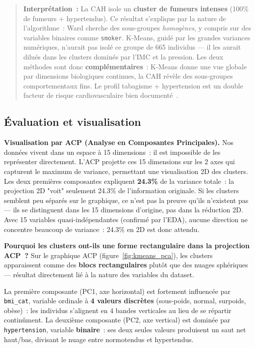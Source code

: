 \begin{quote}
\textbf{Interprétation~:} La CAH isole un \textbf{cluster de fumeurs intenses} (100\% de fumeurs + hypertendus). Ce résultat s'explique par la nature de l'algorithme~: Ward cherche des sous-groupes \textit{homogènes}, y compris sur des variables binaires comme \texttt{smoker}. K-Means, guidé par les grandes variances numériques, n'aurait pas isolé ce groupe de 665 individus --- il les aurait dilués dans les clusters dominés par l'IMC et la pression. Les deux méthodes sont donc \textbf{complémentaires}~: K-Means donne une vue globale par dimensions biologiques continues, la CAH révèle des sous-groupes comportementaux fins. Le profil tabagisme + hypertension est un double facteur de risque cardiovasculaire bien documenté~\cite{booth2012}.
\end{quote}

\FloatBarrier

\subsection{Évaluation et visualisation}

\textbf{Visualisation par ACP (Analyse en Composantes Principales).} Nos données vivent dans un espace à 15 dimensions~: il est impossible de les représenter directement. L'ACP projette ces 15 dimensions sur les 2 axes qui capturent le maximum de variance, permettant une visualisation 2D des clusters. Les deux premières composantes expliquent \textbf{24.3\%} de la variance totale~: la projection 2D "voit" seulement 24.3\% de l'information originale. Si les clusters semblent peu séparés sur le graphique, ce n'est pas la preuve qu'ils n'existent pas --- ils se distinguent dans les 15 dimensions d'origine, pas dans la réduction 2D. Avec 15 variables quasi-indépendantes (confirmé par l'EDA), aucune direction ne concentre beaucoup de variance~: 24.3\% en 2D est donc attendu.

\textbf{Pourquoi les clusters ont-ils une forme rectangulaire dans la projection ACP~?} Sur le graphique ACP (figure~\ref{fig:kmeans_pca}), les clusters apparaissent comme des \textbf{blocs rectangulaires} plutôt que des nuages sphériques --- résultat directement lié à la nature des variables du dataset.

La première composante (PC1, axe horizontal) est fortement influencée par \texttt{bmi\_cat}, variable ordinale à \textbf{4 valeurs discrètes} (sous-poids, normal, surpoids, obèse)~: les individus s'alignent en 4 bandes verticales au lieu de se répartir continûment. La deuxième composante (PC2, axe vertical) est dominée par \texttt{hypertension}, variable \textbf{binaire}~: ses deux seules valeurs produisent un saut net haut/bas, divisant le nuage entre normotendus et hypertendus.

